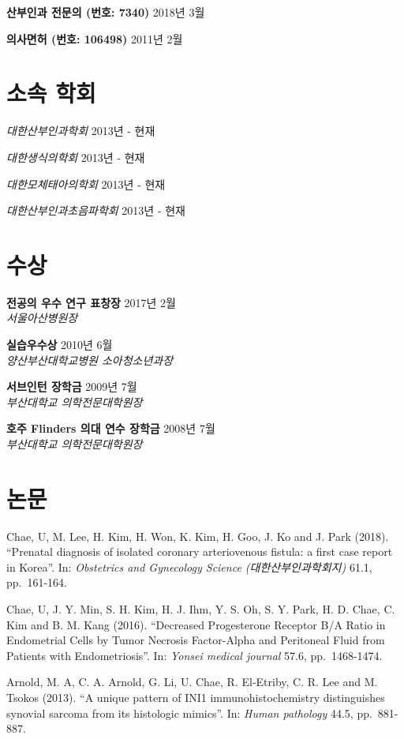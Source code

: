 \documentclass[12pt,]{article}
\begin{document}
\textbf{산부인과 전문의 (번호: 7340)} \hfill 2018년 3월

\textbf{의사면허 (번호: 106498)} \hfill 2011년 2월

\hypertarget{-}{%
\section{소속 학회}\label{-}}

\emph{대한산부인과학회} \hfill 2013년 - 현재

\emph{대한생식의학회} \hfill 2013년 - 현재

\emph{대한모체태아의학회} \hfill 2013년 - 현재

\emph{대한산부인과초음파학회} \hfill 2013년 - 현재

\section{수상}

\textbf{전공의 우수 연구 표창장} \hfill 2017년 2월\\
\emph{서울아산병원장}

\textbf{실습우수상} \hfill 2010년 6월\\
\emph{양산부산대학교병원 소아청소년과장}

\textbf{서브인턴 장학금} \hfill 2009년 7월\\
\emph{부산대학교 의학전문대학원장}

\textbf{호주 Flinders 의대 연수 장학금} \hfill 2008년 7월\\
\emph{부산대학교 의학전문대학원장}

\section{논문}

Chae, U, M. Lee, H. Kim, H. Won, K. Kim, H. Goo, J. Ko and J. Park
(2018). ``Prenatal diagnosis of isolated coronary arteriovenous fistula:
a first case report in Korea''. In: \emph{Obstetrics and Gynecology
Science (대한산부인과학회지)} 61.1, pp.~161-164.

Chae, U, J. Y. Min, S. H. Kim, H. J. Ihm, Y. S. Oh, S. Y. Park, H. D.
Chae, C. Kim and B. M. Kang (2016). ``Decreased Progesterone Receptor
B/A Ratio in Endometrial Cells by Tumor Necrosis Factor-Alpha and
Peritoneal Fluid from Patients with Endometriosis''. In: \emph{Yonsei
medical journal} 57.6, pp.~1468-1474.

Arnold, M. A, C. A. Arnold, G. Li, U. Chae, R. El-Etriby, C. R. Lee and
M. Tsokos (2013). ``A unique pattern of INI1 immunohistochemistry
distinguishes synovial sarcoma from its histologic mimics''. In:
\emph{Human pathology} 44.5, pp.~881-887.
\end{document}
